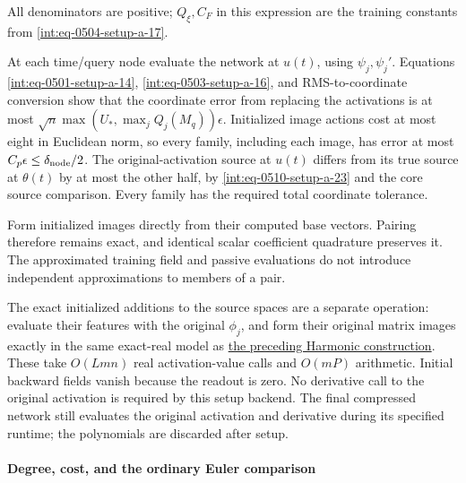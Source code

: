 
All denominators are positive; \(Q_\xi,\allowbreak C_F\) in this expression are the training constants from \hyperref[int:eq-setup-a-17]{\eqref{int:eq-0504-setup-a-17}}.



At each time/query node evaluate the network at \(u(t)\), using \(\psi_j,\allowbreak \psi_j'\). Equations \hyperref[int:eq-setup-a-14]{\eqref{int:eq-0501-setup-a-14}}, \hyperref[int:eq-setup-a-16]{\eqref{int:eq-0503-setup-a-16}}, and RMS-to-coordinate conversion show that the coordinate error from replacing the activations is at most \(\sqrt n\max(U_*,\allowbreak \max_jQ_j(M_q))\epsilon\). Initialized image actions cost at most eight in Euclidean norm, so every family, including each image, has error at most \(C_p\epsilon\le\delta_{\rm node}/2\). The original-activation source at \(u(t)\) differs from its true source at \(\theta(t)\) by at most the other half, by \hyperref[int:eq-setup-a-23]{\eqref{int:eq-0510-setup-a-23}} and the core source comparison. Every family has the required total coordinate tolerance.



Form initialized images directly from their computed base vectors. Pairing therefore remains exact, and identical scalar coefficient quadrature preserves it. The approximated training field and passive evaluations do not introduce independent approximations to members of a pair.



The exact initialized additions to the source spaces are a separate operation: evaluate their features with the original \(\phi_j\), and form their original matrix images exactly in the same exact-real model as \hyperref[int:harmonic-construction]{the preceding Harmonic construction}. These take \(O(Lmn)\) real activation-value calls and \(O(mP)\) arithmetic. Initial backward fields vanish because the readout is zero. No derivative call to the original activation is required by this setup backend. The final compressed network still evaluates the original activation and derivative during its specified runtime; the polynomials are discarded after setup.


\paragraph{Degree, cost, and the ordinary Euler comparison}
\label{int:setup-activation-6}
\mbox{}\par\smallskip

